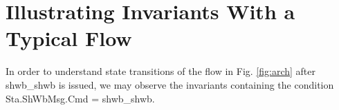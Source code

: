 \documentclass{llncs-new}
\def \twoSpaces {\ \ }
\def \twoSpaces {\ \ }
\begin{document}



\vspace{-5pt}
\section{Illustrating Invariants  With a Typical Flow \label{sec:relatingWithFlow}}
\vspace{-5pt}

In order to understand state transitions of the flow in Fig. \ref{fig:arch} after shwb\_shwb is issued, we may observe the invariants containing the condition Sta.ShWbMsg.Cmd = shwb\_shwb.
\end{document}
